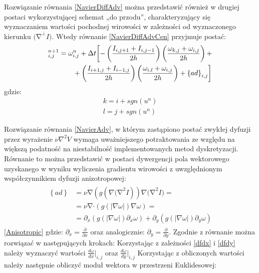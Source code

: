 \documentclass[12pt, twoside, openany]{report}
\theoremstyle{definition}
\begin{document}
Rozwiązanie równania \eqref{NavierDiffAdv} można przedstawić również w drugiej postaci wykorzystującej schemat „do przodu”, charakteryzujący się wyznaczaniem wartości pochodnej wirowości w zależności od wyznaczonego kierunku ${\mathrm{(}\mathrm{\nabla }}^{\bot }I)$.  Wtedy równanie \eqref{NavierDiffAdvCen} przyjmuje postać:
\begin{align}
\fontsize{11}
{\omega }^{n+1}_{i,j} &= {\omega }^n_{i,j}+\Delta t\biggl[
-\left(\frac{I_{i,j+1}+I_{i,j-1}}{2h}\right)\left(\frac{{\omega }_{k,j}+{\omega }_{i,j}}{2h}\right)+ \notag\\ 
&\qquad+ \left(\frac{I_{i+1,j}+I_{i-1,j}}{2h}\right)\left(\frac{{\omega }_{i,l}+{\omega }_{i,j}}{2h}\right)+{\left\{ad\right\}}_{i,j} \biggr]
\label{NavierDiffAdvFor}
\end{align}
gdzie:
\begin{align}
k = i+sgn\left(u^n\right) \\
l = j+sgn(u^n)
\end{align}
\par
Rozwiązanie równania \eqref{NavierAdv}, w którym zastąpiono postać zwykłej dyfuzji przez wyrażenie $\nu {\nabla }^2V$ wymaga uważniejszego potraktowania ze względu na większą podatność na niestabilność implementowanych metod dyskretyzacji. Równanie to można przedstawić w postaci dywergencji pola wektorowego uzyskanego w wyniku wyliczenia gradientu wirowości z uwzględnionym współczynnikiem dyfuzji anizotropowej:
\begin{align}
\begin{aligned}
\left\{ad\right\} 
&= \nu \mathrm{\nabla }(g(\nabla {\mathrm{(}\mathrm{\nabla }}^2I))\nabla {\mathrm{(}\mathrm{\nabla }}^2I)= \\[1ex]
&= \nu \mathrm{\nabla }\mathrm{\cdot}(g(|\nabla \omega |)\nabla \omega )=\\[1ex]
&= {\partial }_x\left(g\left(\left|\nabla \omega \right|\right){\partial }_x\omega \right)+{\partial }_y\left(g\left(\left|\nabla \omega \right|\right){\partial }_y\omega \right)
\end{aligned}
\label{Anisotropic}
\end{align}
\eqref{Anisotropic}
gdzie: ${\partial }_x=\frac{\partial }{\partial x}$ oraz analogicznie: ${\partial }_y=\frac{\partial }{\partial y}$.
Zgodnie z \cite{ebrahimi2012navier} równanie można rozwiązać w następujących krokach:
Korzystając z zależności \eqref{dfdx} i \eqref{dfdy} należy wyznaczyć wartości ${\frac{d\omega }{dx}}\big|_{i,j}$ oraz ${\frac{d\omega }{dy}}\big|_{i,j}$
Korzystając z obliczonych wartości należy następnie obliczyć moduł wektora w przestrzeni Euklidesowej:
\end{document}
